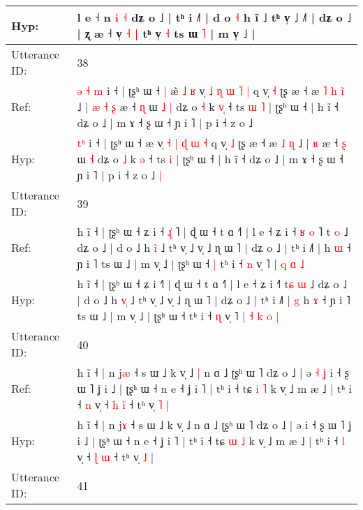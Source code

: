 \documentclass[10pt]{article}
\DeclareRobustCommand{\hl}[1]{{\textcolor{red}{#1}}}
\begin{document}
\begin{longtable}{ll}
 \\
Hyp: & l e ˧ n \hl{}\hl{i} \hl{˧} dʑ o ˩ | tʰ i ˩˥ | d o \hl{˧} h ĩ ˩ tʰ v̩ ˩\hl{}\hl{}\hl{} ˩˥ | dʑ o ˩ | ʐ æ ˧ v̩\hl{ }\hl{˧} \hl{|} tʰ v̩ \hl{˧} ts ɯ \hl{˥} | m v̩ ˩ |
 \\
\midrule
Utterance ID: & 38 \\
Ref: & \hl{ə}\hl{ }\hl{˧}\hl{ }\hl{m} i ˧ | ʈʂʰ ɯ ˧\hl{ }\hl{|} æ\hl{̃}\hl{ }\hl{˩}\hl{ }\hl{ʁ} v̩ \hl{˩} \hl{ɳ} \hl{ɯ} \hl{˥} \hl{|} q v̩ \hl{˧} ʈʂ æ ˧ æ\hl{ }\hl{˥} \hl{h} \hl{i}\hl{̃} ˩ |\hl{ }\hl{æ}\hl{ }\hl{˧} \hl{ʂ} æ ˧ \hl{ɳ} ɯ\hl{ }\hl{˩} \hl{|} dʑ o \hl{˧} k \hl{v}\hl{̩} ˧ ts\hl{ }\hl{ɯ} \hl{˥} | ʈʂʰ ɯ ˧ | h ĩ ˧ dʑ o ˩ | m ɤ ˧ ʂ ɯ ˧ ɲ i ˥ | p i ˧ z o ˩\hl{}\hl{}
 \\
Hyp: & \hl{}\hl{}\hl{}\hl{t}\hl{ʰ} i ˧ | ʈʂʰ ɯ ˧\hl{}\hl{} æ\hl{}\hl{}\hl{}\hl{}\hl{} v̩ \hl{˧} \hl{|} \hl{ɖ} \hl{ɯ} \hl{˧} q v̩ \hl{˩} ʈʂ æ ˧ æ\hl{}\hl{} \hl{˩} \hl{}\hl{ɳ} ˩ |\hl{}\hl{}\hl{}\hl{} \hl{ʁ} æ ˧ \hl{ʂ} ɯ\hl{}\hl{} \hl{˧} dʑ o \hl{˩} k \hl{}\hl{ə} ˧ ts\hl{}\hl{} \hl{i} | ʈʂʰ ɯ ˧ | h ĩ ˧ dʑ o ˩ | m ɤ ˧ ʂ ɯ ˧ ɲ i ˥ | p i ˧ z o ˩\hl{ }\hl{|}
 \\
\midrule
Utterance ID: & 39 \\
Ref: & h ĩ ˧ | ʈʂʰ ɯ ˧ ʑ i ˧\hl{ }\hl{ɻ}\hl{̍}\hl{ }˥ | ɖ ɯ ˧ t ɑ ˧˥ | l e ˧ ʑ i ˧\hl{ }\hl{ʁ}\hl{ }\hl{o}\hl{ }˥ t\hl{} \hl{o} ˩ dʑ o ˩ | d o ˩ h \hl{i}\hl{̃} ˩ tʰ v̩ ˩ v̩ ˩ ɳ ɯ ˥ | dʑ o ˩ | tʰ i ˩˥ |\hl{}\hl{} h \hl{ɯ} ˧ ɲ i ˥ ts ɯ ˩ | m v̩ ˩ | ʈʂʰ ɯ ˧\hl{ }\hl{|} tʰ i ˧ \hl{n} v̩ ˥ |\hl{}\hl{} \hl{q} \hl{ɑ} \hl{˩}
 \\
Hyp: & h ĩ ˧ | ʈʂʰ ɯ ˧ ʑ i ˧\hl{}\hl{}\hl{}\hl{}˥ | ɖ ɯ ˧ t ɑ ˧˥ | l e ˧ ʑ i ˧\hl{}\hl{}\hl{}\hl{}\hl{}˥ t\hl{ɕ} \hl{ɯ} ˩ dʑ o ˩ | d o ˩ h \hl{v}\hl{̩} ˩ tʰ v̩ ˩ v̩ ˩ ɳ ɯ ˥ | dʑ o ˩ | tʰ i ˩˥ |\hl{ }\hl{g} h \hl{ɤ} ˧ ɲ i ˥ ts ɯ ˩ | m v̩ ˩ | ʈʂʰ ɯ ˧\hl{}\hl{} tʰ i ˧ \hl{ɳ} v̩ ˥ |\hl{ }\hl{˧} \hl{k} \hl{o} \hl{|}
 \\
\midrule
Utterance ID: & 40 \\
Ref: & h ĩ ˧ | n j\hl{æ} ˧ s ɯ ˩ k v̩ ˩\hl{ }\hl{|} n ɑ ˩ ʈʂʰ ɯ ˥ dʑ o ˩ | ə\hl{ }\hl{˧}\hl{ }\hl{ʝ} i ˧ ʂ ɯ ˥ ʝ i ˩ | ʈʂʰ ɯ ˧ n e ˧ ʝ i ˥ | tʰ i ˧ tɕ \hl{i} \hl{˥} k v̩ ˩ m æ ˩ | tʰ i ˧ \hl{n} v̩ ˧ \hl{h} \hl{i}\hl{̃} ˧ tʰ v̩ \hl{˥} |
 \\
Hyp: & h ĩ ˧ | n j\hl{ɤ} ˧ s ɯ ˩ k v̩ ˩\hl{}\hl{} n ɑ ˩ ʈʂʰ ɯ ˥ dʑ o ˩ | ə\hl{}\hl{}\hl{}\hl{} i ˧ ʂ ɯ ˥ ʝ i ˩ | ʈʂʰ ɯ ˧ n e ˧ ʝ i ˥ | tʰ i ˧ tɕ \hl{ɯ} \hl{˩} k v̩ ˩ m æ ˩ | tʰ i ˧ \hl{l} v̩ ˧ \hl{ɭ} \hl{}\hl{ɯ} ˧ tʰ v̩ \hl{˩} |
 \\
\midrule
Utterance ID: & 41 \\

\end{longtable}
\end{document}
